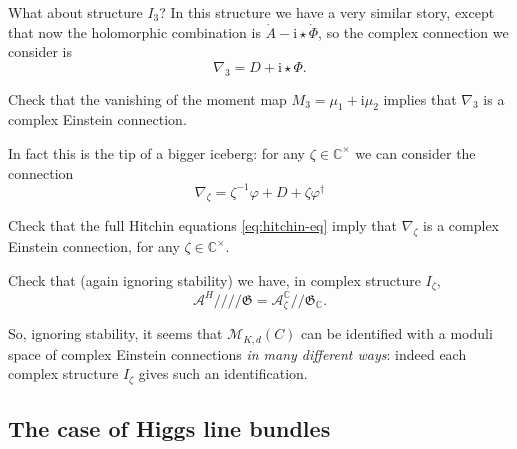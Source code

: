 \documentclass[12pt,letterpaper,reqno]{article}
\numberwithin{equation}{section}
\newcommand{\fG}{{\mathfrak G}}
\newcommand{\cM}{\ensuremath{\mathcal M}}
\newcommand{\cA}{\ensuremath{\mathcal A}}
\newcommand{\C}{\ensuremath{\mathbb C}}
\newcommand{\kq}{/\!\!/}
\newcommand{\hkq}{/\!\!/\!\!/\!\!/}
\newcommand{\I}{{\mathrm i}}
\newcommand{\ti}[1]{\textit{#1}}
\begin{document}
What about structure $I_3$? In this structure we have a very similar
story, except that now the holomorphic combination is
$\dot A - \I \star \dot \Phi$, so the complex connection we consider is
\begin{equation}
  \nabla_3 = D + \I \star \Phi.
\end{equation}

\begin{exercise}
Check that the vanishing of the moment map $M_3 = \mu_1 + \I \mu_2$
implies that $\nabla_3$ is a complex Einstein connection.
\end{exercise}

In fact this is the tip of a bigger iceberg:
for any $\zeta \in \C^\times$ we can consider the connection
\begin{equation} \label{eq:nabla-zeta}
  \nabla_\zeta = \zeta^{-1} \varphi + D + \zeta \varphi^\dagger
\end{equation}

\begin{exercise}
Check that the full Hitchin equations \eqref{eq:hitchin-eq}
imply that $\nabla_\zeta$ is a complex Einstein connection,
for any $\zeta \in \C^\times$.
\end{exercise}

\begin{exercise}
Check that (again ignoring stability) we have,
in complex structure $I_\zeta$,
\begin{equation}
  \cA^H \hkq \fG = \cA_\zeta^\C \kq \fG_\C.
\end{equation}
\end{exercise}

So, ignoring stability, it seems that $\cM_{K,d}(C)$ can be identified with
a moduli space of complex Einstein connections
\ti{in many different ways}: indeed each
complex structure $I_\zeta$ gives such an identification.


\subsection{The case of Higgs line bundles}
\end{document}
